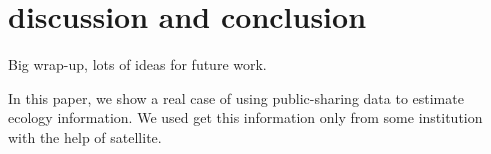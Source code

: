 \documentclass[10pt,journal,compsoc]{IEEEtran}
\begin{document}
%
%









%
%
%

\section{discussion and conclusion}




Big wrap-up, lots of ideas for future work.

In this paper, we show a real case of using public-sharing data to estimate ecology information.
We used get this information only from some institution with the help of satellite.
\end{document}
